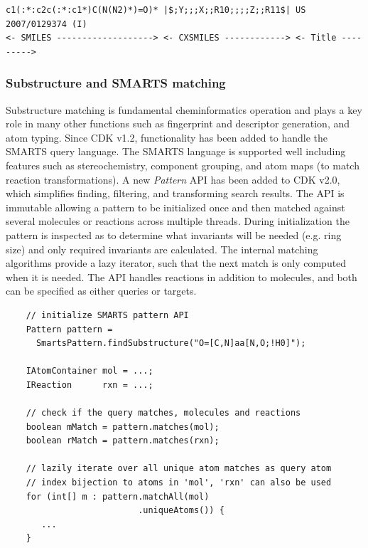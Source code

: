 \documentclass[doublespacing]{bmcart}
\def \cdkversion {v2.0}
\begin{document}
\vspace{0.2cm}
\small
\begin{verbatim}
c1(:*:c2c(:*:c1*)C(N(N2)*)=O)* |$;Y;;;X;;R10;;;;Z;;R11$| US 2007/0129374 (I)
<- SMILES -------------------> <- CXSMILES ------------> <- Title --------->
\end{verbatim}
\normalsize
\vspace{0.2cm}

\subsubsection*{Substructure and SMARTS matching}

Substructure matching is fundamental cheminformatics operation and
plays a key role in many other functions such as fingerprint and
descriptor generation, and atom typing. Since CDK v1.2, functionality
has been added to handle the SMARTS query language. The SMARTS
language is supported well including features such as
stereochemistry, component grouping, and atom
maps (to match reaction transformations). A new \textit{Pattern} API
has been added to CDK \cdkversion{}, which simplifies finding,
filtering, and transforming search results. The API is immutable allowing a
pattern to be initialized once and then matched against several
molecules or reactions across multiple threads. During initialization
the pattern is inspected as to determine what invariants will be
needed (e.g. ring size) and only required invariants are calculated. The
internal matching algorithms provide a lazy iterator, such that the
next match is only computed when it is needed. The API handles
reactions in addition to molecules, and both can be specified as
either queries or targets.

\vspace{0.2cm}
  \begin{verbatim}
    // initialize SMARTS pattern API
    Pattern pattern = 
      SmartsPattern.findSubstructure("O=[C,N]aa[N,O;!H0]");

    IAtomContainer mol = ...;
    IReaction      rxn = ...;

    // check if the query matches, molecules and reactions
    boolean mMatch = pattern.matches(mol);
    boolean rMatch = pattern.matches(rxn);         

    // lazily iterate over all unique atom matches as query atom
    // index bijection to atoms in 'mol', 'rxn' can also be used
    for (int[] m : pattern.matchAll(mol)
                          .uniqueAtoms()) {
       ...
    }
  \end{verbatim}
\vspace{0.2cm}
\end{document}

